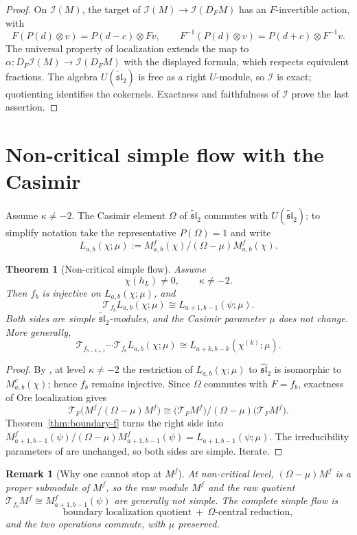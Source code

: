 \documentclass[11pt,a4paper]{article}
\newcommand{\slh}{\widehat{\mathfrak{sl}}_2}
\newcommand{\slt}{\widetilde{\mathfrak{sl}}_2}
\newcommand{\I}{\mathcal I}
\newcommand{\T}{\mathcal T}
\theoremstyle{plainupright}
\newtheorem{theorem}[proposition]{Theorem}
\newtheorem{remark}[proposition]{Remark}
\begin{document}
\begin{proof}
On \(\I(M)\), the target of \(\I(M)\to\I(D_FM)\) has an \(F\)-invertible
action, with
\[
F(P(d)\otimes v)=P(d-c)\otimes Fv,\qquad
F^{-1}(P(d)\otimes v)=P(d+c)\otimes F^{-1}v.
\]
The universal property of localization extends the map to
\(\alpha:D_F\I(M)\to\I(D_FM)\) with the displayed formula, which respects
equivalent fractions. The algebra \(U(\slt)\) is free as a right \(U\)-module,
so \(\I\) is exact; quotienting identifies the cokernels. Exactness and
faithfulness of \(\I\) prove the last assertion.
\end{proof}

\section{Non-critical simple flow with the Casimir}\label{sec:omega}

Assume \(\kappa\ne-2\). The Casimir element \(\Omega\) of \(\slt\) commutes
with \(U(\slt)\); to simplify notation take the representative \(P(\Omega)=1\)
and write
\[
L_{a,b}(\chi;\mu):=M^f_{a,b}(\chi)/(\Omega-\mu)M^f_{a,b}(\chi).
\]

\begin{theorem}[Non-critical simple flow]\label{thm:omega-flow}
Assume
\[
\chi(h_L)\ne0,\qquad \kappa\ne-2.
\]
Then \(f_b\) is injective on \(L_{a,b}(\chi;\mu)\), and
\[
\boxed{\ \T_{f_b}L_{a,b}(\chi;\mu)\cong L_{a+1,b-1}(\psi;\mu).\ }
\]
Both sides are simple \(\slt\)-modules, and the Casimir parameter \(\mu\) does
not change. More generally,
\[
\T_{f_{b-k+1}}\cdots\T_{f_b}L_{a,b}(\chi;\mu)
\cong L_{a+k,b-k}(\chi^{(k)};\mu).
\]
\end{theorem}

\begin{proof}
By \cite[formula (4.1)]{FGXZ}, at level \(\kappa\ne-2\) the restriction of
\(L_{a,b}(\chi;\mu)\) to \(\slh\) is isomorphic to \(M^c_{a,b}(\chi)\); hence
\(f_b\) remains injective. Since \(\Omega\) commutes with \(F=f_b\), exactness
of Ore localization gives
\[
\T_F\bigl(M^f/(\Omega-\mu)M^f\bigr)
\cong
\bigl(\T_FM^f\bigr)/(\Omega-\mu)\bigl(\T_FM^f\bigr).
\]
Theorem~\ref{thm:boundary-f} turns the right side into
\(M^f_{a+1,b-1}(\psi)/(\Omega-\mu)M^f_{a+1,b-1}(\psi)
=L_{a+1,b-1}(\psi;\mu)\). The irreducibility parameters of
\cite[Theorem 4.1]{FGXZ} are unchanged, so both sides are simple. Iterate.
\end{proof}

\begin{remark}[Why one cannot stop at \(M^f\)]\label{rem:omega}
At non-critical level, \((\Omega-\mu)M^f\) is a proper submodule of \(M^f\),
so the raw module \(M^f\) and the raw quotient
\(\T_{f_b}M^f\cong M^f_{a+1,b-1}(\psi)\) are generally not simple. The
complete simple flow is
\[
\boxed{\ \text{boundary localization quotient}\ +\ \Omega\text{-central reduction},\ }
\]
and the two operations commute, with \(\mu\) preserved.
\end{remark}
\end{document}
